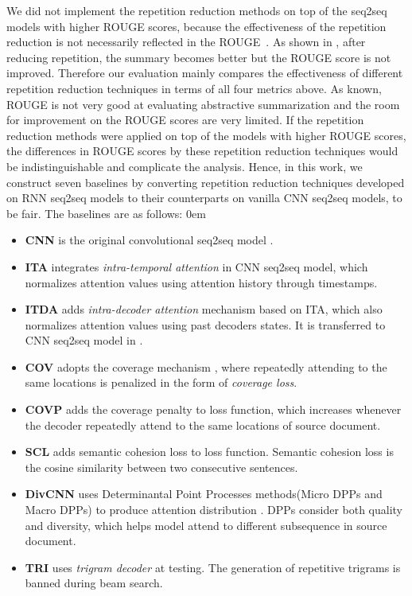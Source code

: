 We did not implement the repetition reduction methods 
on top of the seq2seq models with higher ROUGE scores,
because the effectiveness of the repetition reduction is not necessarily
reflected in the ROUGE~\citep{SeeLM17, PaulusXS17, FanGA18}.
As shown in , 
after reducing repetition, the summary becomes better
but the ROUGE score is not improved. 
Therefore our evaluation mainly compares
the effectiveness of different repetition reduction techniques
in terms of all four metrics above.
As known, ROUGE is not very good at evaluating abstractive summarization
and the room for improvement on the ROUGE scores are very limited.
If the repetition reduction methods 
were applied on top of the models with higher ROUGE scores, 
the differences in ROUGE scores by these repetition reduction techniques would be
indistinguishable and complicate the analysis. 
Hence, in this work, 
we construct seven baselines 
by converting
repetition reduction techniques developed on RNN seq2seq models to their
counterparts on vanilla CNN seq2seq models,
to be fair.
The baselines are as follows:
\itemsep0em
\begin{itemize}
\item \textbf{CNN} is the original convolutional seq2seq model \citep{gehring2017convs2s}. 
\item \textbf{ITA} integrates \textit{intra-temporal attention} \citep{NallapatiZSGX16} in CNN seq2seq model, which normalizes attention values using attention history through timestamps. 
\item \textbf{ITDA} adds \textit{intra-decoder attention} mechanism \citep{PaulusXS17} based on ITA,
which also normalizes attention values using past decoders states.
It is transferred to CNN seq2seq model in \citep{FanGA18}.
\item \textbf{COV} adopts the coverage mechanism \citep{SeeLM17}, where repeatedly
attending to the same locations is penalized in the form of \textit{coverage loss}. 
\item \textbf{COVP} adds the coverage penalty \citep{GehrmannDR18} to loss function,
which increases whenever the decoder repeatedly attend to the same locations of source document.
\item \textbf{SCL} adds semantic cohesion loss \citep{elikyilmazBHC18} to loss function.
Semantic cohesion loss is the cosine similarity between two consecutive sentences.
\item \textbf{DivCNN} uses Determinantal Point Processes methods(Micro DPPs and
Macro DPPs) to produce attention distribution \citep{DivC2C19}. DPPs consider both quality and diversity, which helps model attend to different subsequence in source document.
\item \textbf{TRI} uses \textit{trigram decoder} \citep{PaulusXS17} at testing. The generation of repetitive trigrams is banned during beam search.
\end{itemize}

